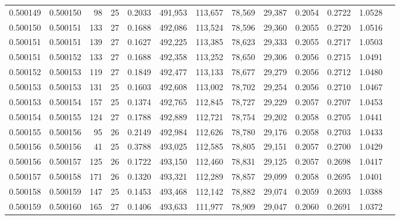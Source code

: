 \begin{tabular}{rrrrrrrrrrrrr}
0.500149 & 0.500150 &  98 &  25 &                                     0.2033 & 491,953 & 113,657 &  78,569 &  29,387 & 0.2054 & 0.2722 & 1.0528 \\
0.500150 & 0.500151 & 133 &  27 &                                     0.1688 & 492,086 & 113,524 &  78,596 &  29,360 & 0.2055 & 0.2720 & 1.0516 \\
0.500151 & 0.500151 & 139 &  27 &                                     0.1627 & 492,225 & 113,385 &  78,623 &  29,333 & 0.2055 & 0.2717 & 1.0503 \\
0.500151 & 0.500152 & 133 &  27 &                                     0.1688 & 492,358 & 113,252 &  78,650 &  29,306 & 0.2056 & 0.2715 & 1.0491 \\
0.500152 & 0.500153 & 119 &  27 &                                     0.1849 & 492,477 & 113,133 &  78,677 &  29,279 & 0.2056 & 0.2712 & 1.0480 \\
0.500153 & 0.500153 & 131 &  25 &                                     0.1603 & 492,608 & 113,002 &  78,702 &  29,254 & 0.2056 & 0.2710 & 1.0467 \\
0.500153 & 0.500154 & 157 &  25 &                                     0.1374 & 492,765 & 112,845 &  78,727 &  29,229 & 0.2057 & 0.2707 & 1.0453 \\
0.500154 & 0.500155 & 124 &  27 &                                     0.1788 & 492,889 & 112,721 &  78,754 &  29,202 & 0.2058 & 0.2705 & 1.0441 \\
0.500155 & 0.500156 &  95 &  26 &                                     0.2149 & 492,984 & 112,626 &  78,780 &  29,176 & 0.2058 & 0.2703 & 1.0433 \\
0.500156 & 0.500156 &  41 &  25 &                                     0.3788 & 493,025 & 112,585 &  78,805 &  29,151 & 0.2057 & 0.2700 & 1.0429 \\
0.500156 & 0.500157 & 125 &  26 &                                     0.1722 & 493,150 & 112,460 &  78,831 &  29,125 & 0.2057 & 0.2698 & 1.0417 \\
0.500157 & 0.500158 & 171 &  26 &                                     0.1320 & 493,321 & 112,289 &  78,857 &  29,099 & 0.2058 & 0.2695 & 1.0401 \\
0.500158 & 0.500159 & 147 &  25 &                                     0.1453 & 493,468 & 112,142 &  78,882 &  29,074 & 0.2059 & 0.2693 & 1.0388 \\
0.500159 & 0.500160 & 165 &  27 &                                     0.1406 & 493,633 & 111,977 &  78,909 &  29,047 & 0.2060 & 0.2691 & 1.0372 \\

\end{tabular}
